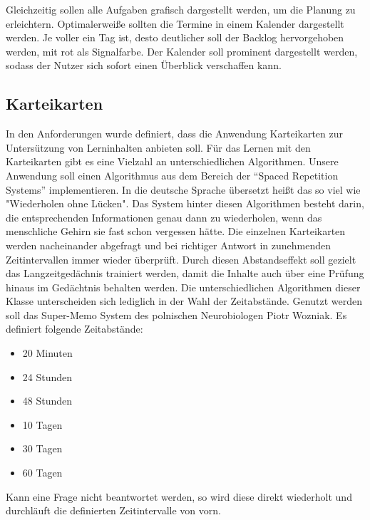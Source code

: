 Gleichzeitig sollen alle Aufgaben grafisch dargestellt werden, um die Planung zu erleichtern.
Optimalerweiße sollten die Termine in einem Kalender dargestellt werden.
Je voller ein Tag ist, desto deutlicher soll der Backlog hervorgehoben werden, mit rot als Signalfarbe. Der Kalender soll prominent dargestellt werden, sodass der Nutzer sich sofort einen Überblick verschaffen kann. 


\subsection{Karteikarten}
In den Anforderungen wurde definiert, dass die Anwendung Karteikarten zur Untersützung von Lerninhalten anbieten soll.
Für das Lernen mit den Karteikarten gibt es eine Vielzahl an unterschiedlichen Algorithmen. Unsere Anwendung soll einen Algorithmus aus dem Bereich der \enquote{Spaced Repetition Systems} implementieren. In die deutsche Sprache übersetzt heißt das so viel wie "Wiederholen ohne Lücken". Das System hinter diesen Algorithmen besteht darin, die entsprechenden Informationen genau dann zu wiederholen, wenn das menschliche Gehirn sie fast schon vergessen hätte.\autocite[Vgl.][]{Tabibian3988} Die einzelnen Karteikarten werden nacheinander abgefragt und bei richtiger Antwort in zunehmenden Zeitintervallen immer wieder überprüft. Durch diesen Abstandseffekt soll gezielt das Langzeitgedächnis trainiert werden, damit die Inhalte auch über eine Prüfung hinaus im Gedächtnis behalten werden. Die unterschiedlichen Algorithmen dieser Klasse unterscheiden sich lediglich in der Wahl der Zeitabstände. 
Genutzt werden soll das Super-Memo System des polnischen Neurobiologen Piotr Wozniak. Es definiert folgende Zeitabstände:
\begin{itemize}
	\item 20 Minuten
	\item 24 Stunden
	\item 48 Stunden
	\item 10 Tagen
	\item 30 Tagen
	\item 60 Tagen
\end{itemize}  
Kann eine Frage nicht beantwortet werden, so wird diese direkt wiederholt und durchläuft die definierten Zeitintervalle von vorn. \autocite[Vgl.][]{BaileyuDavey}



